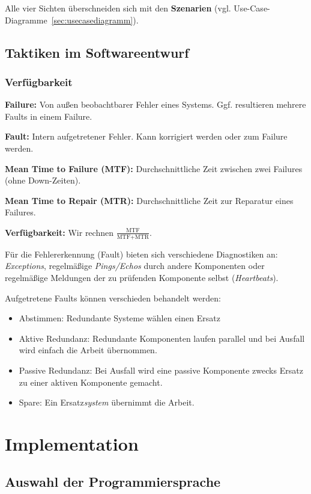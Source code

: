 \documentclass{panikzettel}
\begin{document}
Alle vier Sichten überschneiden sich mit den \textbf{Szenarien} (vgl. Use-Case-Diagramme~\ref{sec:usecasediagramm}).

\subsection{Taktiken im Softwareentwurf}

\subsubsection{Verfügbarkeit}

\textbf{Failure:} Von außen beobachtbarer Fehler eines Systems. Ggf. resultieren mehrere Faults in einem Failure.

\textbf{Fault:} Intern aufgetretener Fehler. Kann korrigiert werden oder zum Failure werden.

\textbf{Mean Time to Failure (MTF):} Durchschnittliche Zeit zwischen zwei Failures (ohne Down-Zeiten).

\textbf{Mean Time to Repair (MTR):} Durchschnittliche Zeit zur Reparatur eines Failures.

\textbf{Verfügbarkeit:} Wir rechnen $\frac{\textrm{MTF}}{\textrm{MTF}+\textrm{MTR}}$.

Für die Fehlererkennung (Fault) bieten sich verschiedene Diagnostiken an: \emph{Exceptions}, regelmäßige \emph{Pings/Echos} durch andere Komponenten oder regelmäßige Meldungen der zu prüfenden Komponente selbst (\emph{Heartbeats}).

Aufgetretene Faults können verschieden behandelt werden: \begin{itemize}
\item Abstimmen: Redundante Systeme wählen einen Ersatz
\item Aktive Redundanz: Redundante Komponenten laufen parallel und bei Ausfall wird einfach die Arbeit übernommen.
\item Passive Redundanz: Bei Ausfall wird eine passive Komponente zwecks Ersatz zu einer aktiven Komponente gemacht.
\item Spare: Ein Ersatz\emph{system} übernimmt die Arbeit.
\end{itemize}

\section{Implementation}

\subsection{Auswahl der Programmiersprache}
\end{document}
